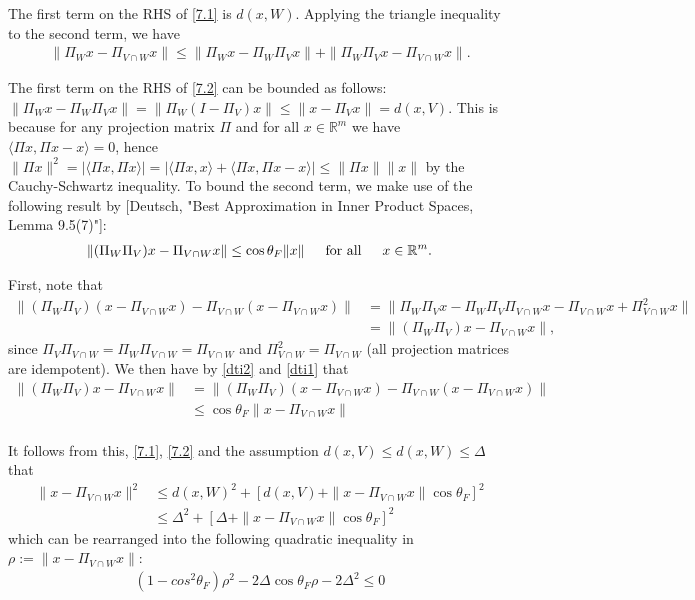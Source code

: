 \documentclass[journal,onecolumn]{IEEEtran}
\begin{document}
The first term on the RHS of \eqref{7.1} is $d(x,W)$. Applying the triangle inequality to the second term, we have
\begin{align}\label{7.2}
\|\Pi_Wx - \Pi_{V \cap W} x\| \leq \|\Pi_Wx - \Pi_W\Pi_V x\| + \|\Pi_W\Pi_Vx - \Pi_{V \cap W}x\|.
\end{align}

The first term on the RHS of \eqref{7.2}  can be bounded as follows: $\|\Pi_Wx - \Pi_W\Pi_V x\| = \|\Pi_W(I - \Pi_V)x\| \leq \|x - \Pi_Vx\| = d(x,V)$. This is because for any projection matrix $\Pi$ and for all $x \in \mathbb{R}^m$ we have $\langle \Pi x,\Pi x - x \rangle = 0$, hence $\|\Pi x\|^2 = | \langle \Pi x, \Pi x \rangle | = | \langle \Pi x, x \rangle + \langle \Pi x, \Pi x - x \rangle | \leq \|\Pi x\|\|x\|$ by the Cauchy-Schwartz inequality. To bound the second term, we make use of the following result by [Deutsch, "Best Approximation in Inner Product Spaces, Lemma 9.5(7)"]:
\begin{align}\label{dti2}
\|(\Pi_W\Pi_V)x - \Pi_{V \cap W}x\| \leq \cos\theta_F\|x\| \indent \text{for all} \indent x \in \mathbb{R}^m.
\end{align}

First, note that
\begin{align}\label{dti1}
\|(\Pi_W\Pi_V)(x - \Pi_{V \cap W}x) - \Pi_{V \cap W}(x - \Pi_{V \cap W}x)\| 
&= \| \Pi_W \Pi_V x - \Pi_W \Pi_V \Pi_{V \cap W} x - \Pi_{V \cap W} x + \Pi_{V \cap W}^2 x \| \nonumber \\
&= \|(\Pi_W \Pi_V) x - \Pi_{V \cap W} x \|,
\end{align}
%
since $\Pi_V \Pi_{V \cap W} = \Pi_W \Pi_{V \cap W} = \Pi_{V \cap W}$ and $\Pi_{V \cap W}^2 = \Pi_{V \cap W}$ (all projection matrices are idempotent). We then have by \eqref{dti2} and \eqref{dti1} that
\begin{align*}
\|(\Pi_W \Pi_V) x - \Pi_{V \cap W} x \| 
&= \|(\Pi_W\Pi_V)(x - \Pi_{V \cap W}x) - \Pi_{V \cap W}(x - \Pi_{V \cap W}x)\| \\
&\leq \cos\theta_F \|x - \Pi_{V \cap W}x\| \\
\end{align*}

It follows from this, \eqref{7.1}, \eqref{7.2} and the assumption $d(x,V) \leq d(x,W) \leq \Delta$ that
\begin{align*}
\|x - \Pi_{V \cap W}x\|^2 &\leq d(x, W)^2 + \left[ d(x, V) + \|x - \Pi_{V \cap W}x\| \cos\theta_F \right]^2 \\
&\leq \Delta^2 + \left[ \Delta + \|x - \Pi_{V \cap W}x\| \cos\theta_F \right]^2
\end{align*}
%
which can be rearranged into the following quadratic inequality in $\rho := \|x - \Pi_{V \cap W}x\|$:
\begin{align}\label{quadineq}
\left( 1 - cos^2\theta_F \right)\rho^2 - 2 \Delta \cos\theta_F\rho - 2 \Delta^2 \leq 0
\end{align}
\end{document}
